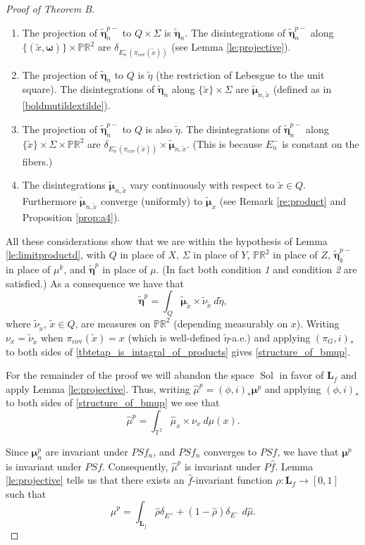 \documentclass[11pt,letterpaper,reqno]{article}
\newcommand{\Pp}{\mathbb P}
\newcommand{\TT}{\mathbb{T}^2}
\newcommand{\RR}{\mathbb{R}^2}
\newcommand{\hTTf}[1][f]{\mathbf{L}_{#1}}
\newcommand{\tx}{\tilde{x}}
\newcommand{\bomega}{\boldsymbol{\omega}}
\newcommand{\hf}{\hat{f}}
\newcommand{\bmu}{\boldsymbol{\mu}}
\newcommand{\tbmu}{\tilde{\bmu}}
\newcommand{\hmu}{\hat{\mu}}
\newcommand{\teta}{\tilde{\eta}}
\newcommand{\tbeta}{\tilde{\boldsymbol{\eta}}}
\newcommand{\pcov}{\pi_{\mathrm{cov}}}
\newcommand{\Sol}{\operatorname{Sol}}
\begin{document}
\begin{proof}[Proof of Theorem B]
\begin{enumerate}
\item
The projection of $\tbeta_n^{p-}$ to $Q \times \Sigma$ is $\tbeta_n $. The disintegrations of $\tbeta_n^{p-}$ along $ \{(\tx, \bomega) \} \times \Pp \RR$ are $\delta_{E^-_n(\pcov(\tx))}$ (see Lemma \ref{le:projective}). 
\item
The projection of $\tbeta_n$ to $Q$ is $\teta$ (the restriction of Lebesgue to the unit square). The disintegrations of $\tbeta_n$ along $\{\tx\}\times \Sigma$ are $\tbmu_{n,\tx}$ (defined as in \eqref{boldmutildextilde}).
\item
The projection of $\tbeta_n^{p-}$ to $Q$ is also $\teta$. The disintegrations of $\tbeta_n^{p-}$ along $\{\tx\} \times \Sigma \times \Pp \RR$ are $\delta_{E^-_n(\pcov(\tx))}\times\tbmu_{n,\tx}$. (This is because $E^-_n$ is constant on the fibers.)
\item
The disintegrations $\tbmu_{n,\tx}$ vary continuously with respect to  $\tx\in Q$. Furthermore  $\tbmu_{n,\tx}$ converge (uniformly) to $\tbmu_x$ (see Remark \ref{re:product} and Proposition \ref{prop:a4}).
\end{enumerate}

All these considerations show that we are within the hypothesis of Lemma \ref{le:limitproductd}, with $Q$ in place of $X$, $\Sigma$ in place of $Y$, $\Pp \RR$ in place of $Z$, $\tbeta_k^{p-}$ in place of $\mu^k$, and $\tbeta^{p}$ in place of $\mu$. (In fact both condition \emph{1} and condition \emph{2} are satisfied.) As a consequence we have that
\begin{equation} \label{tbtetap_is_intagral_of_products}
\tbeta^p=\int_{ Q}  \tbmu_{\tx}  \times \tilde{\nu}_{\tx} \ d\teta,
\end{equation}
where $\tilde{\nu}_{\tx}$, $\tx \in Q$,  are measures on $\Pp \RR$ (depending measurably on $x$). Writing $\nu_x = \tilde{\nu}_{\tx}$ when $\pcov(\tx) = x$ (which is well-defined $\teta$-a.e.) and applying $(\pi_G,i)_*$ to both sides of \eqref{tbtetap_is_intagral_of_products} gives \eqref{structure_of_bmup}. 

For the remainder of the proof we will abandon the space $\Sol$ in favor of $\hTTf$ and apply Lemma \ref{le:projective}. Thus, writing $\hmu^p = (\phi,i)_* \bmu^p$ and applying $(\phi,i)_*$ to both sides of \eqref{structure_of_bmup} we see that
\[ \hmu^p = \int_{\TT} \hat\mu_x \times \nu_x \ d\mu(x). \]

Since $\bmu_n^p$ are invariant under $PS f_n$, and $PS f_n$ converges to $PS f$, we have that $\bmu^p$ is invariant under $PS f$. Consequently, $\hmu^p$ is invariant under $P \hf$. Lemma \ref{le:projective} tells us that there exists an $\hat f$-invariant function $\hat\rho:\hTTf\rightarrow[0,1]$ such that
$$
\hat\mu^p=\int_{\hTTf}\hat\rho\delta_{E^+}+(1-\hat\rho)\delta_{E^-}\ d\hat\mu.
$$


\end{proof}
\end{document}

